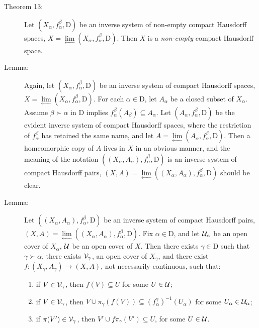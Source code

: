 \documentclass{article}
\def\plim{\lim\limits_{\leftarrow}^{}}
\begin{document}
\begin{description}
\item[Theorem 13:] Let $(X_{\alpha}, f_{\alpha}^{\beta}, \text{D})$ be an inverse system of non-empty compact Hausdorff spaces, $X = \plim (X_{\alpha}, f_{\alpha}^{\beta}, \text{D})$. Then $X$ is a \emph{non-empty} compact Hausdorff space.

\item[Lemma:] Again, let $(X_{\alpha}, f_{\alpha}^{\beta}, \text{D})$ be an inverse system of compact Hausdorff spaces, $X = \plim (X_{\alpha}, f_{\alpha}^{\beta}, \text{D})$. For each $\alpha \in \text{D}$, let $A_\alpha$ be a closed subset of $X_{\alpha}$. Assume $\beta \succ \alpha$ in $\text{D}$ implies $f_{\alpha}^{\beta}(A_{\beta}) \subseteq A_{\alpha}$. Let $(A_{\alpha}, f_{\alpha}^{\beta}, \text{D})$ be the evident inverse system of compact Hausdorff spaces, where the restriction of $f_{\alpha}^{\beta}$ has retained the same name, and let $A = \plim (A_{\alpha}, f_{\alpha}^{\beta}, \text{D})$. Then a homeomorphic copy of $A$ lives in $X$ in an obvious manner, and the meaning of the notation $((X_{\alpha}, A_{\alpha}), f_{\alpha}^{\beta}, \text{D})$ is an inverse system of compact Hausdorff pairs, $(X,A) = \plim ((X_{\alpha}, A_{\alpha}), f_{\alpha}^{\beta}, \text{D})$ should be clear.

\item[Lemma:] Let $((X_{\alpha}, A_{\alpha}), f_{\alpha}^{\beta}, \text{D})$ be an inverse system of compact Hausdorff pairs, $(X,A) = \plim ((X_{\alpha}, A_{\alpha}), f_{\alpha}^{\beta}, \text{D})$. Fix $\alpha \in \text{D}$, and let ${\cal U}_{\alpha}$ be an open cover of $X_{\alpha}$, ${\cal U}$ be an open cover of $X$. Then there exists $\gamma \in \text{D}$ such that $\gamma \succ \alpha$, there exists ${\cal V}_{\gamma}$, an open cover of $X_{\gamma}$, and there exist $f: (X_{\gamma}, A_{\gamma}) \longrightarrow (X,A)$, not necessarily continuous, such that:
  \begin{enumerate}[\hspace{1cm}(1)]
    \item if $V \in {\cal V}_{\gamma}$, then $f(V) \subseteq U$ for some $U \in {\cal U}$;
    \item if $V \in {\cal V}_{\gamma}$, then $V \cup\pi_{\gamma} (f(V)) \subseteq (f_{\alpha}^{\gamma})^{-1}(U_{\alpha} )$ for some $U_{\alpha} \in {\cal U}_{\alpha}$;
    \item if $\pi(V') \in {\cal V}_{\gamma}$, then $V' \cup f\pi_{\gamma} (V') \subseteq U$, for some $U \in {\cal U}$.
  \end{enumerate}


\end{description}
\end{document}
